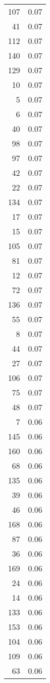 \begin{longtable}{rr}
  107 & 0.07 \\ 
   41 & 0.07 \\ 
  112 & 0.07 \\ 
  140 & 0.07 \\ 
  129 & 0.07 \\ 
   10 & 0.07 \\ 
    5 & 0.07 \\ 
    6 & 0.07 \\ 
   40 & 0.07 \\ 
   98 & 0.07 \\ 
   97 & 0.07 \\ 
   42 & 0.07 \\ 
   22 & 0.07 \\ 
  134 & 0.07 \\ 
   17 & 0.07 \\ 
   15 & 0.07 \\ 
  105 & 0.07 \\ 
   81 & 0.07 \\ 
   12 & 0.07 \\ 
   72 & 0.07 \\ 
  136 & 0.07 \\ 
   55 & 0.07 \\ 
    8 & 0.07 \\ 
   44 & 0.07 \\ 
   27 & 0.07 \\ 
  106 & 0.07 \\ 
   75 & 0.07 \\ 
   48 & 0.07 \\ 
    7 & 0.06 \\ 
  145 & 0.06 \\ 
  160 & 0.06 \\ 
   68 & 0.06 \\ 
  135 & 0.06 \\ 
   39 & 0.06 \\ 
   46 & 0.06 \\ 
  168 & 0.06 \\ 
   87 & 0.06 \\ 
   36 & 0.06 \\ 
  169 & 0.06 \\ 
   24 & 0.06 \\ 
   14 & 0.06 \\ 
  133 & 0.06 \\ 
  153 & 0.06 \\ 
  104 & 0.06 \\ 
  109 & 0.06 \\ 
   63 & 0.06 \\ 

\end{longtable}
